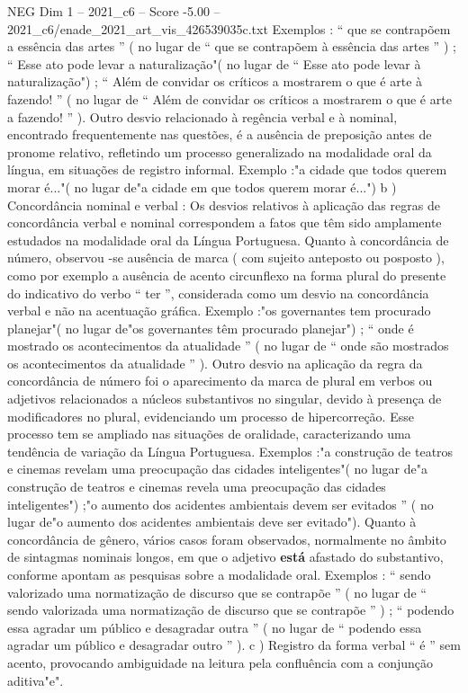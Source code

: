 \begin{textsample}{NEG Dim 1 – 2021\_c6 – Score -5.00 – 2021\_c6/enade\_2021\_art\_vis\_426539035c.txt}
Exemplos : “ que se contrapõem a essência das artes ” ( no lugar de “ que se contrapõem à essência das artes ” ) ; “ Esse ato pode levar a naturalização"( no lugar de “ Esse ato pode levar à naturalização") ; “ Além de convidar os críticos a mostrarem o que é arte à fazendo! ” ( no lugar de “ Além de convidar os críticos a mostrarem o que é arte a fazendo! ” ).
Outro desvio relacionado à regência verbal e à nominal, encontrado frequentemente nas questões, é a ausência de preposição antes de pronome relativo, refletindo um processo generalizado na modalidade oral da língua, em situações de registro informal.
Exemplo :"a cidade que todos querem morar é..."( no lugar de"a cidade em que todos querem morar é...") b ) Concordância nominal e verbal : Os desvios relativos à aplicação das regras de concordância verbal e nominal correspondem a fatos que têm sido amplamente estudados na modalidade oral da Língua Portuguesa.
Quanto à concordância de número, observou -se ausência de marca ( com sujeito anteposto ou posposto ), como por exemplo a ausência de acento circunflexo na forma plural do presente do indicativo do verbo “ ter ”, considerada como um desvio na concordância verbal e não na acentuação gráfica.
Exemplo :"os governantes tem procurado planejar"( no lugar de"os governantes têm procurado planejar") ; “ onde é mostrado os acontecimentos da atualidade ” ( no lugar de “ onde são mostrados os acontecimentos da atualidade ” ).
Outro desvio na aplicação da regra da concordância de número foi o aparecimento da marca de plural em verbos ou adjetivos relacionados a núcleos substantivos no singular, devido à presença de modificadores no plural, evidenciando um processo de hipercorreção.
Esse processo tem se ampliado nas situações de oralidade, caracterizando uma tendência de variação da Língua Portuguesa.
Exemplos :"a construção de teatros e cinemas revelam uma preocupação das cidades inteligentes"( no lugar de"a construção de teatros e cinemas revela uma preocupação das cidades inteligentes") ;"o aumento dos acidentes ambientais devem ser evitados ” ( no lugar de"o aumento dos acidentes ambientais deve ser evitado").
Quanto à concordância de gênero, vários casos foram observados, normalmente no âmbito de sintagmas nominais longos, em que o adjetivo \textbf{está} afastado do substantivo, conforme apontam as pesquisas sobre a modalidade oral.
Exemplos : “ sendo valorizado uma normatização de discurso que se contrapõe ” ( no lugar de “ sendo valorizada uma normatização de discurso que se contrapõe ” ) ; “ podendo essa agradar um público e desagradar outra ” ( no lugar de “ podendo essa agradar um público e desagradar outro ” ). c ) Registro da forma verbal “ é ” sem acento, provocando ambiguidade na leitura pela confluência com a conjunção aditiva"e".

\end{textsample}
